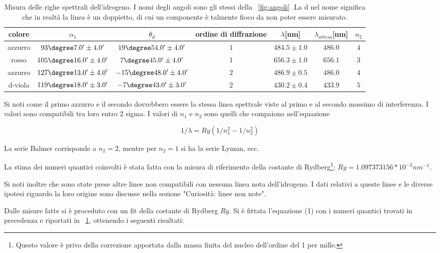 \documentclass[a4paper,10pt]{article}
\begin{document}
{{{{{{\begin{table}[H]
	\centering
	\begin{tabular}{c|c|c|c|c|c|c}
colore & $\alpha_1$ &	$\theta_d$ & ordine di diffrazione & $\lambda$[nm] & $\lambda_{attesa}$[nm]& $n_2$  \\
		\hline
azzurro &  $ 93\degree 7.0' \pm 4.0 ' $  &  $ 19\degree 54.0' \pm 4.0 ' $  &  $ 1 $ & $ 484.5 \pm 1.0 $ & $ 486.0 $ & $ 4 $\\
rosso &  $ 105\degree 16.0' \pm 4.0 ' $  &  $ 7\degree 45.0' \pm 4.0 ' $  &  $ 1 $ & $ 656.3 \pm 1.0 $ & $ 656.1 $ & $ 3 $\\
azzurro &  $ 127\degree 13.0' \pm 4.0 ' $  &  $ -15\degree 48.0' \pm 4.0 ' $  &  $ 2 $ & $ 486.9 \pm 0.5 $ & $ 486.0 $ & $ 4 $\\
d-viola &  $ 119\degree 18.0' \pm 3.0 ' $  &  $ -7\degree 43.0' \pm 3.0 ' $  &  $ 2 $ & $ 430.2 \pm 0.4 $ & $ 433.9 $ & $ 5 $\\
	\end{tabular}
	\caption{Misura delle righe spettrali dell'idrogeno. I nomi degli angoli sono gli stessi della \figurename{~\ref{fig:angoli} }.La d nel nome significa che in realtà la linea è un doppietto, di cui un componente è talmente fioco da non poter essere misurato.}
	\label{tab:HH}
\end{table}

Si noti come il primo azzurro e il secondo dovrebbero essere la stessa linea spettrale viste al primo e al secondo massimo di interferenza. I valori sono compatibili tra loro entro 2 sigma.
I valori di $n_1$ e $n_2$ sono quelli che compaiono nell'equazione

\begin{equation}
 1/\lambda=Ry(1/n_1^2-1/n_2^2)
\end{equation} 
 
La serie Balmer corrisponde a $n_2=2$, mentre per $n_2=1$ si ha la serie Lyman, ecc.	

La stima dei numeri quantici coinvolti è stata fatta con la misura di riferimento della costante di Rydberg\footnote{ Questo valore è privo della correzione apportata dalla massa finita del nucleo dell'ordine del 1 per mille.}: $Ry=1.097373156 * 10^{-2} nm^{-1}$. 


Si noti inoltre che sono state prese altre linee non compatibili con nessuna linea nota dell'idrogeno. I dati relativi a queste linee e le diverse ipotesi riguardo la loro origine sono discusse nella sezione "Curiosità: linee non note".


Dalle misure fatte si è proceduto con un fit della costante di Rydberg $Ry$. Si è fittata l'equazione (1) con i numeri quantici trovati in precedenza e riportati in \tablename{~\ref{tab:HH}, ottenendo i seguenti risultati:\\
	
}}}}}}}
\end{document}
